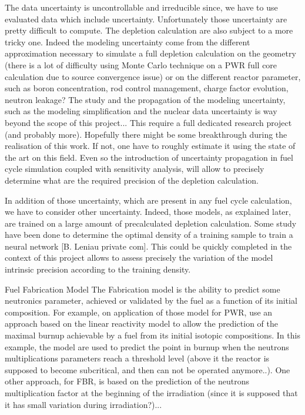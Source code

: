 \documentclass[dvips,12pt]{article}
\begin{document}
The data uncertainty is uncontrollable and irreducible since, we have to use evaluated data which include uncertainty. Unfortunately those uncertainty are pretty difficult to compute.  
The depletion calculation are also subject to a more tricky one. Indeed the modeling uncertainty come from the different approximation necessary to simulate a full depletion calculation on the geometry (there is a lot of difficulty using Monte Carlo technique on a PWR full core calculation due to source convergence issue) or on the different reactor parameter, such as boron concentration, rod control management, charge factor evolution, neutron leakage? 
The study and the propagation of the modeling uncertainty, such as the modeling simplification and the nuclear data uncertainty is way beyond the scope of this project... This require a full dedicated research project (and probably more).  Hopefully there might be some breakthrough during the realisation of this work. If not, one have to roughly estimate it using the state of the art on this field. 
Even so the introduction of uncertainty propagation in fuel cycle simulation coupled with sensitivity analysis, will allow to precisely determine what are the required precision of the depletion calculation.

In addition of those uncertainty, which are present in any fuel cycle calculation, we have to consider other uncertainty. Indeed, those models, as explained later, are trained on a large amount of precalculated depletion calculation. Some study have been done to determine the optimal density of a training sample to train a neural network [B. Leniau private com]. This could be quickly completed in the context of this project allows to assess precisely the variation of the model intrinsic precision according to the training density.

Fuel Fabrication Model
The Fabrication model is the ability to predict some neutronics parameter, achieved or validated by the fuel as a function of its initial composition. 
For example, on application of those model for PWR, use an approach based on the linear reactivity model to allow the prediction of the maximal burnup achievable by a fuel from its initial isotopic compositions. In this example, the model are used to predict the point in burnup when the neutrons multiplications parameters reach a threshold level (above it the reactor is supposed to become subcritical, and then can not be operated anymore..).
One other approach, for FBR, is based on the prediction of the neutrons multiplication factor at the beginning of the irradiation (since it is supposed that it has small variation during irradiation?)... 
\end{document}
